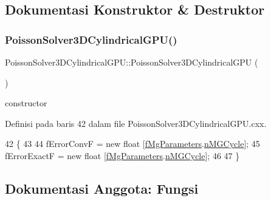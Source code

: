 \subsection{Dokumentasi Konstruktor \& Destruktor}
\hypertarget{classPoissonSolver3DCylindricalGPU_a3c4108b642189cca05ad6715fde97457}{}\label{classPoissonSolver3DCylindricalGPU_a3c4108b642189cca05ad6715fde97457} 
\subsubsection{\texorpdfstring{Poisson\+Solver3\+D\+Cylindrical\+G\+P\+U()}{PoissonSolver3DCylindricalGPU()}}
{\footnotesize\ttfamily Poisson\+Solver3\+D\+Cylindrical\+G\+P\+U\+::\+Poisson\+Solver3\+D\+Cylindrical\+G\+PU (\begin{DoxyParamCaption}{ }\end{DoxyParamCaption})}

constructor 

Definisi pada baris 42 dalam file Poisson\+Solver3\+D\+Cylindrical\+G\+P\+U.\+cxx.


\begin{DoxyCode}
42                                                              \{
43 
44     fErrorConvF = \textcolor{keyword}{new} \textcolor{keywordtype}{float} [\hyperlink{classPoissonSolver3DCylindricalGPU_a0d5484e574537bc26978992b88573517}{fMgParameters}.\hyperlink{structPoissonSolver3DCylindricalGPU_1_1MGParameters_ab8c83ba4715a4bd71b30a27a07b87be9}{nMGCycle}];
45     fErrorExactF = \textcolor{keyword}{new} \textcolor{keywordtype}{float} [\hyperlink{classPoissonSolver3DCylindricalGPU_a0d5484e574537bc26978992b88573517}{fMgParameters}.\hyperlink{structPoissonSolver3DCylindricalGPU_1_1MGParameters_ab8c83ba4715a4bd71b30a27a07b87be9}{nMGCycle}];
46 
47 \}
\end{DoxyCode}


\subsection{Dokumentasi Anggota\+: Fungsi}
\hypertarget{classPoissonSolver3DCylindricalGPU_aa95de949f9cb368eb0c9ee1b8d990a7f}{}\label{classPoissonSolver3DCylindricalGPU_aa95de949f9cb368eb0c9ee1b8d990a7f} 
